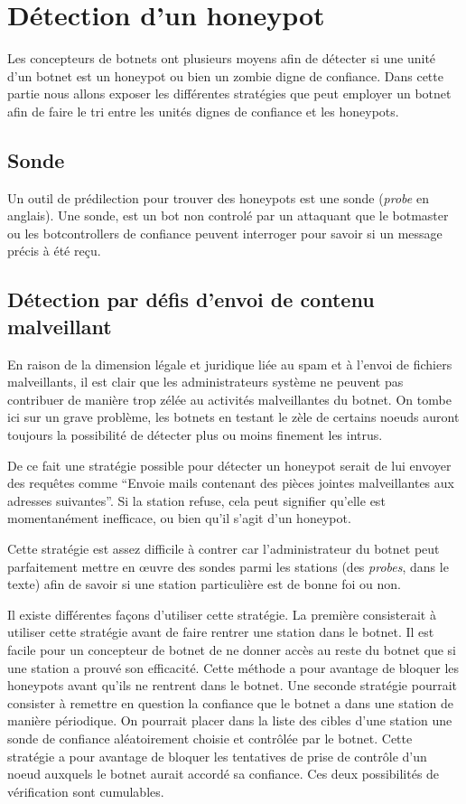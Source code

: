 \section{Détection d'un honeypot}

Les concepteurs de botnets ont plusieurs moyens afin de détecter si
une unité d'un botnet est un honeypot ou bien un zombie digne de confiance.
Dans cette partie nous allons exposer les différentes stratégies que peut employer
un botnet afin de faire le tri entre les unités dignes de confiance et les honeypots.

\subsection{Sonde}

Un outil de prédilection pour trouver des honeypots est une sonde (\textit{probe} en anglais).
Une sonde, est un bot non controlé par un attaquant que le botmaster ou les botcontrollers de confiance
peuvent interroger pour savoir si un message précis à été reçu.

\subsection{Détection par défis d'envoi de contenu malveillant}

En raison de la dimension légale et juridique liée au spam et à l'envoi de fichiers malveillants,
il est clair que les administrateurs système ne peuvent pas contribuer de manière trop zélée au
activités malveillantes du botnet. On tombe ici sur un grave problème, les botnets en testant le
zèle de certains noeuds auront toujours la possibilité de détecter plus ou moins finement les intrus.

De ce fait une stratégie possible pour détecter un honeypot serait de lui envoyer des requêtes comme
``Envoie  mails contenant des pièces jointes malveillantes aux adresses suivantes''. Si la
station refuse, cela peut signifier qu'elle est momentanément inefficace, ou bien qu'il s'agit d'un honeypot.

Cette stratégie est assez difficile à contrer car l'administrateur du botnet peut
parfaitement mettre en œuvre des sondes parmi les stations (des \textit{probes}, dans
le texte) afin de savoir si une station particulière est de bonne foi
ou non.

Il existe différentes façons d'utiliser cette stratégie.
La première consisterait à utiliser cette stratégie avant de faire rentrer une station dans le botnet.
Il est facile pour un concepteur de botnet de ne donner accès au reste du botnet que si une station
a prouvé son efficacité. Cette méthode a pour avantage de bloquer les honeypots avant qu'ils ne rentrent
dans le botnet.
Une seconde stratégie pourrait consister à remettre en question la confiance que le botnet a dans une station 
de manière périodique. On pourrait placer dans la liste des cibles d'une station une sonde
de confiance aléatoirement choisie et contrôlée par le botnet. Cette stratégie a pour avantage de bloquer les tentatives de prise
de contrôle d'un noeud auxquels le botnet aurait accordé sa confiance.
Ces deux possibilités de vérification sont cumulables.


